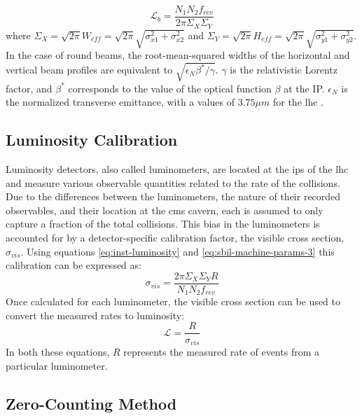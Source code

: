\begin{equation}
\label{eq:sbil-machine-params-6}
\mathcal{L}_b = \frac{N_1 N_2 f_{rev}}{2 \pi \Sigma_X \Sigma_Y}
\end{equation}
where $\Sigma_X = \sqrt{2\pi} W_{eff} = \sqrt{2\pi} \sqrt{\sigma_{x1}^2 + \sigma_{x2}^2}$ and $\Sigma_Y = \sqrt{2\pi} H_{eff} = \sqrt{2\pi} \sqrt{\sigma_{y1}^2 + \sigma_{y2}^2}$. In the case of round beams, the root-mean-squared widths of the horizontal and vertical beam profiles are equivalent to $\sqrt{\epsilon_{N} \beta^{*} / \gamma}$. $\gamma$ is the relativistic Lorentz factor, and $\beta^{*}$ corresponds to the value of the optical function $\beta$ at the IP. $\epsilon_{N}$ is the normalized transverse emittance, with a values of $3.75\mu m$ for the \acrshort{lhc} \cite{Brüning:782076}.

\subsection{Luminosity Calibration}
\label{subsec:luminosity_calibration}

Luminosity detectors, also called luminometers, are located at the \acrshort{ip}s of the \acrshort{lhc} and measure various observable quantities related to the rate of the collisions. Due to the differences between the luminometers, the nature of their recorded observables, and their location at the \acrshort{cms} cavern, each is assumed to only capture a fraction of the total collisions. This bias in the luminometers is accounted for by a detector-specific calibration factor, the visible cross section, $\sigma_{vis}$. Using equations \ref{eq:inst-luminosity} and \ref{eq:sbil-machine-params-3} this calibration can be expressed as:
\begin{equation}
    \label{eq:vis-cross-section}
    \sigma_{vis} = \frac{2 \pi \Sigma_X \Sigma_Y R}{N_1 N_2 f_{rev}}
\end{equation}
Once calculated for each luminometer, the visible cross section can be used to convert the measured rates to luminosity:
\begin{equation}
    \label{eq:luminosity-from-rates}
    \mathcal{L} = \frac{R}{\sigma_{vis}}
\end{equation}
In both these equations, $R$ represents the measured rate of events from a particular luminometer.

\subsection{Zero-Counting Method}
\label{subsec:zero-counting}

